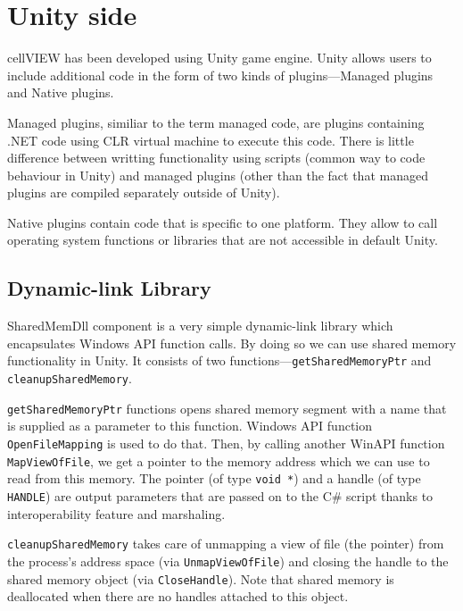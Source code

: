 \documentclass[
  digital, %
  table,   %
  nolof,     %
  nolot,     %
  oneside,
]{fithesis3}
\begin{document}
\section{Unity side}
cellVIEW has been developed using Unity game engine. Unity allows users to include additional code in the form of two kinds of plugins—Managed plugins and Native plugins.

Managed plugins, similiar to the term managed code, are plugins containing .NET code using CLR virtual machine to execute this code. There is little difference between writting functionality using scripts (common way to code behaviour in Unity) and managed plugins (other than the fact that managed plugins are compiled separately outside of Unity).

Native plugins contain code that is specific to one platform. They allow to call operating system functions or libraries that are not accessible in default Unity.

\subsection{Dynamic-link Library}
SharedMemDll component is a very simple dynamic-link library which encapsulates Windows API function calls. By doing so we can use shared memory functionality in Unity. It consists of two functions—\texttt{get\-Shared\-Memory\-Ptr} and \texttt{cleanup\-Shared\-Memory}.

\texttt{getSharedMemoryPtr} functions opens shared memory segment with a name that is supplied as a parameter to this function. Windows API function \texttt{OpenFileMapping} is used to do that. Then, by calling another WinAPI function \texttt{MapViewOfFile}, we get a pointer to the memory address which we can use to read from this memory. The pointer (of type \texttt{void *}) and a handle (of type \texttt{HANDLE}) are output parameters that are passed on to the C\# script thanks to interoperability feature and marshaling.

\texttt{cleanupSharedMemory} takes care of unmapping a view of file (the pointer) from the process's address space (via \texttt{UnmapViewOfFile}) and closing the handle to the shared memory object (via \texttt{CloseHandle}). Note that shared memory is deallocated when there are no handles attached to this object.
\end{document}

